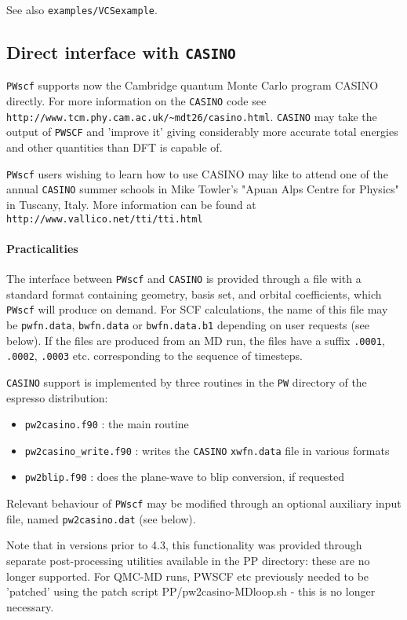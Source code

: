\documentclass[12pt,a4paper]{article}
\begin{document}
See also \texttt{examples/VCSexample}.

\subsection{Direct interface with \texttt{CASINO}} \label{pw2casino_info}

\texttt{PWscf} supports now the Cambridge quantum Monte Carlo program CASINO directly. For more information
on the \texttt{CASINO} code see \texttt{http://www.tcm.phy.cam.ac.uk/\~{}mdt26/casino.html}. 
\texttt{CASINO} may take the output of \texttt{PWSCF} and
'improve it' giving considerably more accurate total energies and other
quantities than DFT is capable of.


\texttt{PWscf} users wishing to learn how to use CASINO may like to attend one
of the annual \texttt{CASINO} summer schools in Mike Towler's "Apuan Alps Centre
for Physics" in Tuscany, Italy. More information can be found at \texttt{http://www.vallico.net/tti/tti.html} 
\paragraph{Practicalities}
The interface between \texttt{PWscf} and \texttt{CASINO} is provided through a file with a
standard format containing geometry, basis set, and orbital coefficients, which
\texttt{PWscf} will produce on demand. For SCF calculations, the name of this file may
be \texttt{pwfn.data}, \texttt{bwfn.data} or \texttt{bwfn.data.b1} depending on user requests (see below).
If the files are produced from an MD run, the files have a suffix \texttt{.0001}, \texttt{.0002},
\texttt{.0003} etc.  corresponding to the sequence of timesteps.

\texttt{CASINO} support is implemented by three routines in the \texttt{PW} directory of the
espresso distribution: 
\begin{itemize}
\item \texttt{pw2casino.f90} : the main routine     
\item \texttt{pw2casino\_write.f90} : writes the \texttt{CASINO} \texttt{xwfn.data} file in various formats
\item \texttt{pw2blip.f90} : does the plane-wave to blip conversion, if requested
\end{itemize}
Relevant behaviour of \texttt{PWscf} may be modified through an optional auxiliary input 
file, named \texttt{pw2casino.dat} (see below).

Note that in versions prior to 4.3, this functionality was provided through
separate post-processing utilities available in the PP directory: these are 
no longer supported. For QMC-MD runs, PWSCF etc previously needed to be 
'patched' using the patch script PP/pw2casino-MDloop.sh - this is no longer 
necessary.
\end{document}
